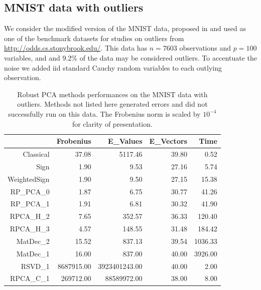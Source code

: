 \documentclass[ss]{imsart}
\theoremstyle{Example}
\begin{document}
\subsection{MNIST data with outliers}
We consider the modified version of the MNIST data, proposed in \cite{ref:ICDM14698_PCA} and used as one of the benchmark datasets for studies on outliers from \url{http://odds.cs.stonybrook.edu/}. This  data has $n = 7603$ observations and $p = 100$ variables, and and 9.2\% of the data may be considered outliers. To accentuate the noise we added iid standard Cauchy random variables to each outlying  observation. 
 \begin{table}[t]
\centering
\begin{tabular}{rrrrr}
  \hline
 & Frobenius & E\_Values & E\_Vectors & Time \\ 
  \hline
Classical & 37.08 & 5117.46 & 39.80 & 0.52 \\ 
  Sign & 1.90 & 9.53 & 27.16 & 5.74 \\ 
  WeightedSign & 1.90 & 9.50 & 27.15 & 15.38 \\ 
  RP\_PCA\_0 & 1.87 & 6.75 & 30.77 & 41.26 \\ 
  RP\_PCA\_1 & 1.91 & 6.81 & 30.32 & 41.90 \\ 
  RPCA\_H\_2 & 7.65 & 352.57 & 36.33 & 120.40 \\ 
  RPCA\_H\_3 & 4.57 & 148.55 & 31.48 & 184.42 \\ 
  MatDec\_2 & 15.52 & 837.13 & 39.54 & 1036.33 \\ 
MatDec\_1 & 16.00 & 837.00 & 40.00 & 3926.00 \\ 
  RSVD\_1 & 8687915.00 & 3923401243.00 & 40.00 & 2.00 \\ 
  RPCA\_C\_1 & 269712.00 & 88589972.00 & 38.00 & 8.00 \\ 
   \hline
\end{tabular}
\caption{Robust PCA methods performances on the MNIST data with outliers. 
Methods not listed here generated errors and did not successfully run on this data. The Frobenius norm is scaled by $10^{-4}$ for clarity of presentation.}
\label{Table:2}
\end{table}
%
\end{document}
